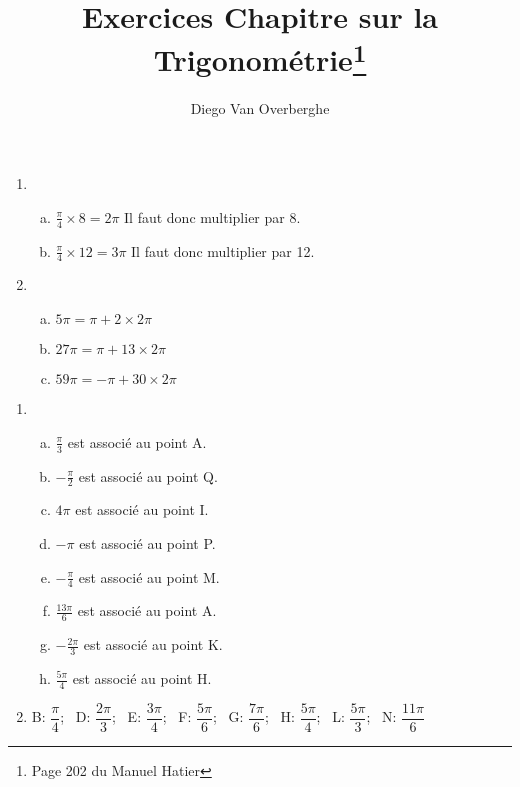 \documentclass[12pt, a4paper]{article}
\begin{document}
    \title{Exercices Chapitre sur la Trigonométrie\footnote{Page 202 du Manuel Hatier}}
    \author{Diego Van Overberghe}
    \maketitle

\begin{Exercise}[number={45}]
    \begin{enumerate}
        \item   \begin{enumerate}[a)]
                \item $\frac{\pi}{4}\times8=2\pi$ \qquad Il faut donc multiplier par 8.
                \item $\frac{\pi}{4}\times12=3\pi$ \qquad Il faut donc multiplier par 12.
        \end{enumerate}
        \item   \begin{enumerate}[a)]
                \item $5\pi = \pi+2\times2\pi$
                \item $27\pi=\pi+13\times2\pi$
                \item $59\pi=-\pi+30\times2\pi$
        \end{enumerate}
    \end{enumerate}
\end{Exercise}

\begin{Exercise}[number={46}]
    \begin{enumerate}
        \item   \begin{enumerate}[a)]
                \item $\frac{\pi}{3}$ est associé au point A.
                \item $-\frac{\pi}{2}$ est associé au point Q.
                \item $4\pi$ est associé au point I.
                \item $-\pi$ est associé au point P.
                \item $-\frac{\pi}{4}$ est associé au point M.
                \item $\frac{13\pi}{6}$ est associé au point A.
                \item $-\frac{2\pi}{3}$ est associé au point K.
                \item $\frac{5\pi}{4}$ est associé au point H.
                \end{enumerate}
        \item   B: $\dfrac{\pi}{4}$; \ D: $\dfrac{2\pi}{3}$; \ E: $\dfrac{3\pi}{4}$; \ F: $\dfrac{5\pi}{6}$; \ G: $\dfrac{7\pi}{6}$; \ H: $\dfrac{5\pi}{4}$; \ L: $\dfrac{5\pi}{3}$; \ N: $\dfrac{11\pi}{6}$
    \end{enumerate}
\end{Exercise}
\end{document}
